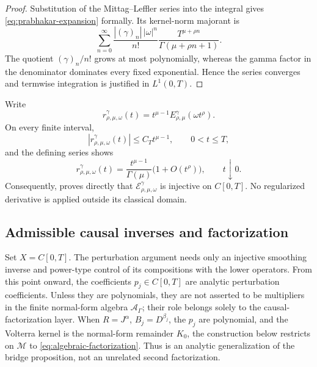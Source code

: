 \documentclass[11pt]{article}
\numberwithin{equation}{section}
\theoremstyle{definition}
\theoremstyle{remark}
\newcommand{\M}{\mathcal M}
\newcommand{\A}{\mathcal A}
\newcommand{\E}{\mathcal E}
\begin{document}
\begin{proof}
Substitution of the Mittag--Leffler series into the integral gives \eqref{eq:prabhakar-expansion} formally. Its kernel-norm majorant is
\begin{equation*}
\sum_{n=0}^{\infty}\frac{|(\gamma)_n|\,|\omega|^n}{n!}
\frac{T^{\mu+\rho n}}{\Gamma(\mu+\rho n+1)}.
\end{equation*}
The quotient $(\gamma)_n/n!$ grows at most polynomially, whereas the gamma factor in the denominator dominates every fixed exponential. Hence the series converges and termwise integration is justified in $L^1(0,T)$.
\end{proof}

Write
\begin{equation}
r_{\rho,\mu,\omega}^{\gamma}(t)
=t^{\mu-1}E_{\rho,\mu}^{\gamma}(\omega t^\rho).
\label{eq:prabhakar-kernel}
\end{equation}
On every finite interval,
\begin{equation*}
|r_{\rho,\mu,\omega}^{\gamma}(t)|\le C_Tt^{\mu-1},
\qquad 0<t\le T,
\end{equation*}
and the defining series shows
\begin{equation*}
r_{\rho,\mu,\omega}^{\gamma}(t)
=\frac{t^{\mu-1}}{\Gamma(\mu)}\bigl(1+O(t^\rho)\bigr),
\qquad t\downarrow0.
\end{equation*}
Consequently,  proves directly that $\E_{\rho,\mu,\omega}^{\gamma}$ is injective on $C[0,T]$. No regularized derivative is applied outside its classical domain.


\subsection{Admissible causal inverses and factorization}

Set $X=C[0,T]$. The perturbation argument needs only an injective smoothing inverse and power-type control of its compositions with the lower operators.
From this point onward, the coefficients $p_j\in C[0,T]$ are analytic perturbation coefficients. Unless they are polynomials, they are not asserted to be multipliers in the finite normal-form algebra $\A_\Gamma$; their role belongs solely to the causal-factorization layer.
When $R=J^\alpha$, $B_j=D^{\beta_j}$, the $p_j$ are polynomial, and the
Volterra kernel is the normal-form remainder $K_0$, the construction below
restricts on $\M$ to \eqref{eq:algebraic-factorization}.  Thus
 is an analytic generalization of the bridge
proposition, not an unrelated second factorization.
\end{document}

